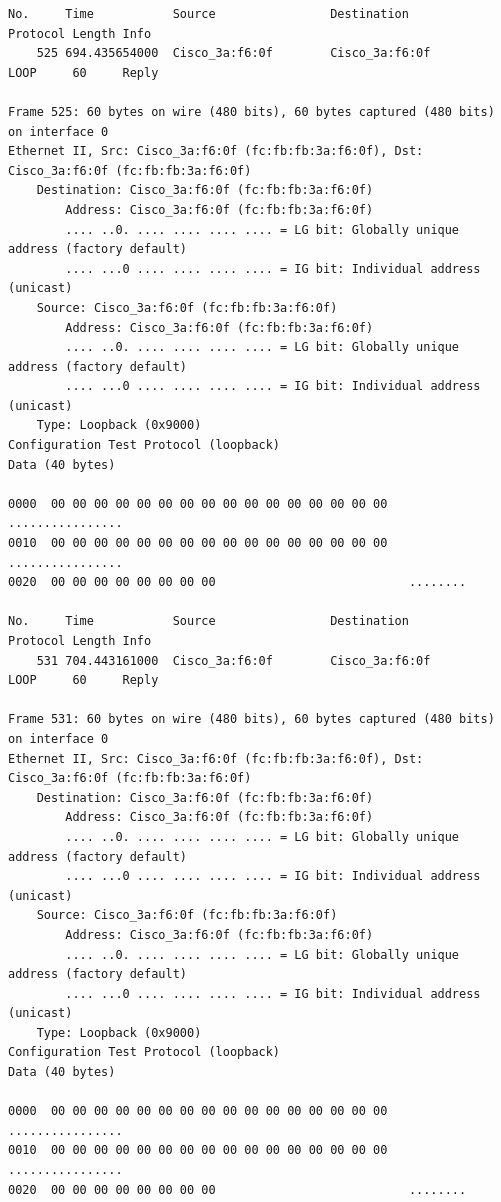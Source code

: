 \documentclass[a4paper,11pt]{article}
\begin{document}
\begin{lstlisting}
No.     Time           Source                Destination           Protocol Length Info
    525 694.435654000  Cisco_3a:f6:0f        Cisco_3a:f6:0f        LOOP     60     Reply

Frame 525: 60 bytes on wire (480 bits), 60 bytes captured (480 bits) on interface 0
Ethernet II, Src: Cisco_3a:f6:0f (fc:fb:fb:3a:f6:0f), Dst: Cisco_3a:f6:0f (fc:fb:fb:3a:f6:0f)
    Destination: Cisco_3a:f6:0f (fc:fb:fb:3a:f6:0f)
        Address: Cisco_3a:f6:0f (fc:fb:fb:3a:f6:0f)
        .... ..0. .... .... .... .... = LG bit: Globally unique address (factory default)
        .... ...0 .... .... .... .... = IG bit: Individual address (unicast)
    Source: Cisco_3a:f6:0f (fc:fb:fb:3a:f6:0f)
        Address: Cisco_3a:f6:0f (fc:fb:fb:3a:f6:0f)
        .... ..0. .... .... .... .... = LG bit: Globally unique address (factory default)
        .... ...0 .... .... .... .... = IG bit: Individual address (unicast)
    Type: Loopback (0x9000)
Configuration Test Protocol (loopback)
Data (40 bytes)

0000  00 00 00 00 00 00 00 00 00 00 00 00 00 00 00 00   ................
0010  00 00 00 00 00 00 00 00 00 00 00 00 00 00 00 00   ................
0020  00 00 00 00 00 00 00 00                           ........

No.     Time           Source                Destination           Protocol Length Info
    531 704.443161000  Cisco_3a:f6:0f        Cisco_3a:f6:0f        LOOP     60     Reply

Frame 531: 60 bytes on wire (480 bits), 60 bytes captured (480 bits) on interface 0
Ethernet II, Src: Cisco_3a:f6:0f (fc:fb:fb:3a:f6:0f), Dst: Cisco_3a:f6:0f (fc:fb:fb:3a:f6:0f)
    Destination: Cisco_3a:f6:0f (fc:fb:fb:3a:f6:0f)
        Address: Cisco_3a:f6:0f (fc:fb:fb:3a:f6:0f)
        .... ..0. .... .... .... .... = LG bit: Globally unique address (factory default)
        .... ...0 .... .... .... .... = IG bit: Individual address (unicast)
    Source: Cisco_3a:f6:0f (fc:fb:fb:3a:f6:0f)
        Address: Cisco_3a:f6:0f (fc:fb:fb:3a:f6:0f)
        .... ..0. .... .... .... .... = LG bit: Globally unique address (factory default)
        .... ...0 .... .... .... .... = IG bit: Individual address (unicast)
    Type: Loopback (0x9000)
Configuration Test Protocol (loopback)
Data (40 bytes)

0000  00 00 00 00 00 00 00 00 00 00 00 00 00 00 00 00   ................
0010  00 00 00 00 00 00 00 00 00 00 00 00 00 00 00 00   ................
0020  00 00 00 00 00 00 00 00                           ........


\end{lstlisting}
\end{document}
